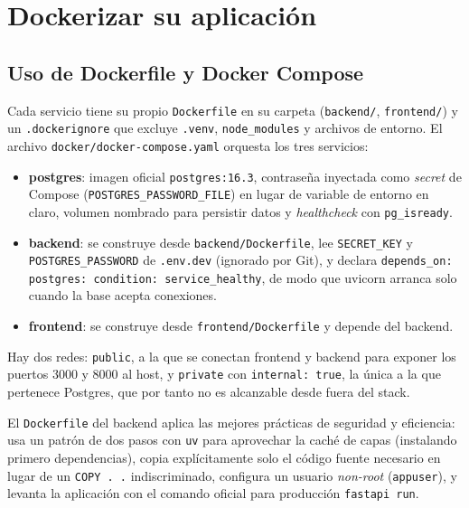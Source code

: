 \section{Dockerizar su aplicación}

\subsection{Uso de Dockerfile y Docker Compose}
Cada servicio tiene su propio \texttt{Dockerfile} en su carpeta (\texttt{backend/}, \texttt{frontend/}) y un \texttt{.dockerignore} que excluye \texttt{.venv}, \texttt{node\_modules} y archivos de entorno. El archivo \texttt{docker/docker-compose.yaml} orquesta los tres servicios:

\begin{itemize}
    \item \textbf{postgres}: imagen oficial \texttt{postgres:16.3}, contraseña inyectada como \emph{secret} de Compose (\texttt{POSTGRES\_PASSWORD\_FILE}) en lugar de variable de entorno en claro, volumen nombrado para persistir datos y \emph{healthcheck} con \texttt{pg\_isready}.
    \item \textbf{backend}: se construye desde \texttt{backend/Dockerfile}, lee \texttt{SECRET\_KEY} y \texttt{POSTGRES\_PASSWORD} de \texttt{.env.dev} (ignorado por Git), y declara \texttt{depends\_on: postgres: condition: service\_healthy}, de modo que uvicorn arranca solo cuando la base acepta conexiones.
    \item \textbf{frontend}: se construye desde \texttt{frontend/Dockerfile} y depende del backend.
\end{itemize}

Hay dos redes: \texttt{public}, a la que se conectan frontend y backend para exponer los puertos 3000 y 8000 al host, y \texttt{private} con \texttt{internal: true}, la única a la que pertenece Postgres, que por tanto no es alcanzable desde fuera del stack.

El \texttt{Dockerfile} del backend aplica las mejores prácticas de seguridad y eficiencia: usa un patrón de dos pasos con \texttt{uv} para aprovechar la caché de capas (instalando primero dependencias), copia explícitamente solo el código fuente necesario en lugar de un \texttt{COPY . .} indiscriminado, configura un usuario \emph{non-root} (\texttt{appuser}), y levanta la aplicación con el comando oficial para producción \texttt{fastapi run}.

